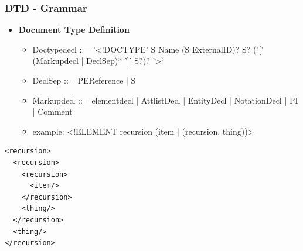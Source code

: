 \documentclass[11pt]{article}
\begin{document}
\subsubsection{DTD - Grammar}
\label{sec:orgb43b643}
\begin{itemize}
\item \textbf{Document Type Definition}
\begin{itemize}
\item Doctypedecl ::= '<!DOCTYPE' S Name (S ExternalID)? S? ('[' (Markupdecl | DeclSep)* ']' S?)? '>‘
\item DeclSep ::= PEReference | S
\item Markupdecl ::= elementdecl | AttlistDecl | EntityDecl | NotationDecl | PI | Comment
\item example: <!ELEMENT recursion (item | (recursion, thing))>
\end{itemize}
\end{itemize}
\lstset{breaklines=true,language=XML,label= ,caption= ,captionpos=b,numbers=none}
\begin{lstlisting}
<recursion>
  <recursion>
    <recursion>
      <item/>
    </recursion>
    <thing/>
  </recursion>
  <thing/>
</recursion>
\end{lstlisting}
\end{document}
